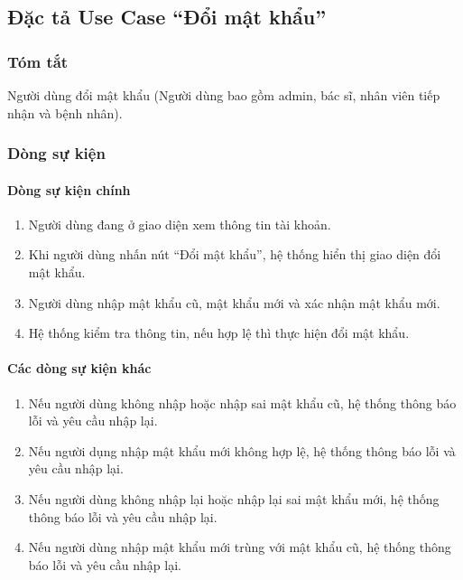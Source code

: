 \subsection{Đặc tả Use Case ``Đổi mật khẩu''}

\subsubsection{Tóm tắt}
Người dùng đổi mật khẩu (Người dùng bao gồm admin, bác sĩ, nhân viên tiếp nhận và bệnh nhân).

\subsubsection{Dòng sự kiện}
\paragraph{\textbf{Dòng sự kiện chính}}
\begin{enumerate}
  \item Người dùng đang ở giao diện xem thông tin tài khoản.
  \item Khi người dùng nhấn nút ``Đổi mật khẩu'', hệ thống hiển thị giao diện đổi mật khẩu.
  \item Người dùng nhập mật khẩu cũ, mật khẩu mới và xác nhận mật khẩu mới.
  \item Hệ thống kiểm tra thông tin, nếu hợp lệ thì thực hiện đổi mật khẩu.
\end{enumerate}

\paragraph{\textbf{Các dòng sự kiện khác}}
\begin{enumerate}
  \item Nếu người dùng không nhập hoặc nhập sai mật khẩu cũ, hệ thống thông báo lỗi và yêu cầu nhập lại.
  \item Nếu người dụng nhập mật khẩu mới không hợp lệ, hệ thống thông báo lỗi và yêu cầu nhập lại.
  \item Nếu người dùng không nhập lại hoặc nhập lại sai mật khẩu mới, hệ thống thông báo lỗi và yêu cầu nhập lại.
  \item Nếu người dùng nhập mật khẩu mới trùng với mật khẩu cũ, hệ thống thông báo lỗi và yêu cầu nhập lại.
\end{enumerate}

